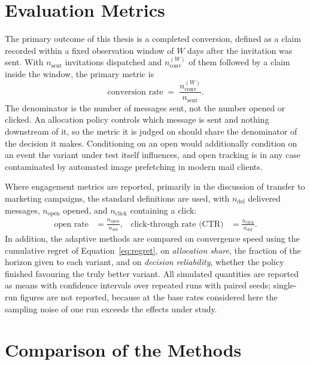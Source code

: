 \section{Evaluation Metrics}
\label{sec:bg_metrics}

The primary outcome of this thesis is a completed conversion, defined as a claim recorded within a fixed observation window of $W$ days after the invitation was sent. With $n_{\mathrm{sent}}$ invitations dispatched and $n_{\mathrm{conv}}^{(W)}$ of them followed by a claim inside the window, the primary metric is
\begin{equation}
    \text{conversion rate} \;=\; \frac{n_{\mathrm{conv}}^{(W)}}{n_{\mathrm{sent}}} .
    \label{eq:conversion_rate}
\end{equation}
The denominator is the number of messages sent, not the number opened or clicked. An allocation policy controls which message is sent and nothing downstream of it, so the metric it is judged on should share the denominator of the decision it makes. Conditioning on an open would additionally condition on an event the variant under test itself influences, and open tracking is in any case contaminated by automated image prefetching in modern mail clients.

Where engagement metrics are reported, primarily in the discussion of transfer to marketing campaigns, the standard definitions are used, with $n_{\mathrm{del}}$ delivered messages, $n_{\mathrm{open}}$ opened, and $n_{\mathrm{click}}$ containing a click:
\begin{align}
    \text{open rate} &= \frac{n_{\mathrm{open}}}{n_{\mathrm{del}}}, &
    \text{click-through rate (CTR)} &= \frac{n_{\mathrm{click}}}{n_{\mathrm{del}}} .
\end{align}
In addition, the adaptive methods are compared on convergence speed using the cumulative regret of Equation~\eqref{eq:regret}, on \emph{allocation share}, the fraction of the horizon given to each variant, and on \emph{decision reliability}, whether the policy finished favouring the truly better variant. All simulated quantities are reported as means with confidence intervals over repeated runs with paired seeds; single-run figures are not reported, because at the base rates considered here the sampling noise of one run exceeds the effects under study.

\section{Comparison of the Methods}
\label{sec:bg_comparison}

